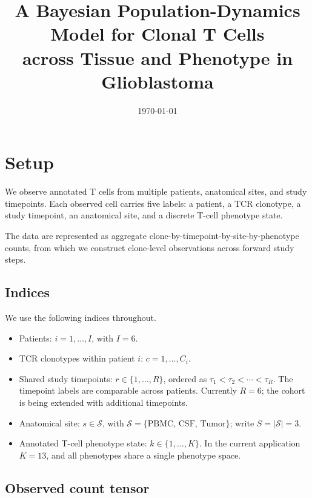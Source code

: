 \documentclass[11pt]{article}
\title{\bfseries\color{accent}\Large A Bayesian Population-Dynamics Model for
Clonal T Cells\\[2pt] across Tissue and Phenotype in Glioblastoma}
\date{\today}
\newcommand{\Ssp}{\mathcal{S}}                    %
\theoremstyle{definition}
\begin{document}
\maketitle

\section{Setup}

We observe annotated T cells from multiple patients, anatomical sites, and
study timepoints. Each observed cell carries five labels: a patient, a TCR
clonotype, a study timepoint, an anatomical site, and a discrete T-cell
phenotype state.

The data are represented as aggregate
clone-by-timepoint-by-site-by-phenotype counts, from which we construct
clone-level observations across forward study steps.

\subsection{Indices}

We use the following indices throughout.
\begin{itemize}[leftmargin=1.4em, itemsep=2pt]
  \item Patients: $i = 1,\ldots,I$, with $I = 6$.
  \item TCR clonotypes within patient $i$: $c = 1,\ldots,C_i$.
  \item Shared study timepoints: $r \in \{1,\ldots,R\}$, ordered as
        $\tau_1 < \tau_2 < \cdots < \tau_R$. The timepoint labels are
        comparable across patients. Currently $R = 6$; the cohort is being
        extended with additional timepoints.
  \item Anatomical site: $s \in \Ssp$, with
        $\Ssp = \{\mathrm{PBMC},\, \mathrm{CSF},\, \mathrm{Tumor}\}$; write
        $S = |\Ssp| = 3$.
  \item Annotated T-cell phenotype state: $k \in \{1,\ldots,K\}$. In the
        current application $K = 13$, and all phenotypes share a single
        phenotype space.
\end{itemize}

\subsection{Observed count tensor}
\end{document}
